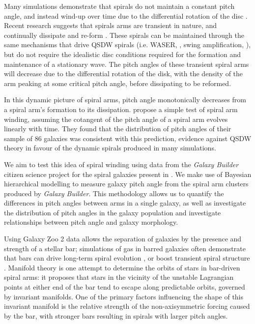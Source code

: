 Many simulations demonstrate that spirals do not maintain a constant pitch angle, and instead wind-up over time due to the differential rotation of the disc \citep{2013ApJ...763...46B}. Recent research suggests that spirals arms are transient in nature, and continually dissipate and re-form \citep{2014PASA...31...35D}. These spirals can be maintained through the same mechanisms that drive QSDW spirals (i.e. WASER, \citealt{1976ApJ...205..363M}, swing amplification, \citealt{1965MNRAS.130..125G}), but do not require the idealistic disc conditions required for the formation and maintenance of a stationary wave. The pitch angles of these transient spiral arms will decrease due to the differential rotation of the disk, with the density of the arm peaking at some critical pitch angle, before dissipating to be reformed.

In this dynamic picture of spiral arms, pitch angle monotonically decreases from a spiral arm's formation to its dissipation. \citet{2019arXiv190910291P} propose a simple test of spiral arm winding, assuming the cotangent of the pitch angle of a spiral arm evolves linearly with time. They found that the distribution of pitch angles of their sample of 86 galaxies was consistent with this prediction, evidence against QSDW theory in favour of the dynamic spirals produced in many simulations.

We aim to test this idea of spiral winding using data from the \textit{Galaxy Builder} citizen science project for the spiral galaxies present in \citet{2020arXiv200610450L}. We make use of Bayesian hierarchical modelling to measure galaxy pitch angle from the spiral arm clusters produced by \textit{Galaxy Builder}. This methodology allows us to quantify the differences in pitch angles between arms in a single galaxy, as well as investigate the distribution of pitch angles in the galaxy population and investigate relationships between pitch angle and galaxy morphology.

Using Galaxy Zoo 2 data \citep{Willett2013:1308.3496v2} allows the separation of galaxies by the presence and strength of a stellar bar; simulations of gas in barred galaxies often demonstrate that bars can drive long-term spiral evolution \citep{2008A&A...489..115R}, or boost transient spiral structure \citep{2012MNRAS.426..167G}. Manifold theory is one attempt to determine the orbits of stars in bar-driven spiral arms: it proposes that stars in the vicinity of the unstable Lagrangian points at either end of the bar tend to escape along predictable orbits, governed by invariant manifolds. One of the primary factors influencing the shape of this invariant manifold is the relative strength of the non-axisymmetric forcing caused by the bar, with stronger bars resulting in spirals with larger pitch angles.


